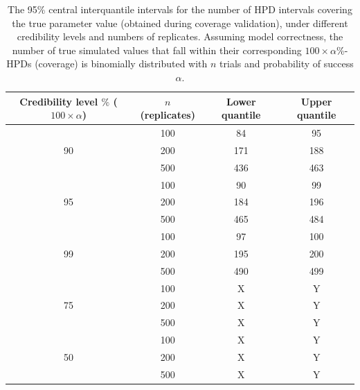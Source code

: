 \documentclass[oneside]{article}
\begin{document}
\begin{table}
\begin{center}
\begin{tabular}{cccc}
\hline
Credibility level $\%$ ($100 \times \alpha$) & $n$ (replicates) & Lower quantile & Upper quantile \\ \hline
  \rowcolor{gray!10}   & 100            & 84    & 95    \\
  \rowcolor{gray!10}90 & 200            & 171   & 188   \\
  \rowcolor{gray!10}   & 500            & 436   & 463   \\
                       & 100            & 90    & 99    \\
                  95   & 200            & 184   & 196   \\
                       & 500            & 465   & 484   \\
  \rowcolor{gray!10}   & 100            & 97    & 100   \\
  \rowcolor{gray!10}99 & 200            & 195   & 200   \\
  \rowcolor{gray!10}   & 500            & 490   & 499   \\
                       & 100            & X     & Y     \\
                 75    & 200            & X     & Y     \\
                       & 500            & X     & Y     \\             
  \rowcolor{gray!10}   & 100            & X     & Y     \\
  \rowcolor{gray!10}50 & 200            & X     & Y     \\   
  \rowcolor{gray!10}   & 500            & X     & Y     \\ \hline%
\end{tabular}
\end{center}
\caption{The 95\% central interquantile intervals for the number of HPD intervals covering the true parameter value (obtained during coverage validation), under different credibility levels and numbers of replicates.
  Assuming model correctness, the number of true simulated values that fall within their corresponding $100 \times \alpha$\%-HPDs (coverage) is binomially distributed with $n$ trials and probability of success $\alpha$.}
\label{tab:coverage2}
\end{table}
\end{document}
